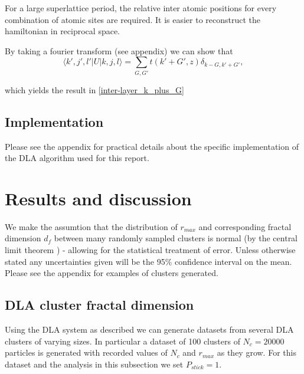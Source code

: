 \documentclass[10pt, twocolumn]{article} %
\begin{document}
  For a large superlattice period, the relative inter atomic positions for every combination of atomic sites are required. It is easier to reconstruct the hamiltonian in reciprocal space.

  By taking a fourier transform (see appendix) we can show that
  \begin{equation}
    \langle k',j',l' | U | k, j, l \rangle = \sum_{G, G'} t(k'+G', z) \delta_{k-G, k'+G'},
    \label{inter-layer_hopping_elements}
  \end{equation}
  
  which yields the result in \ref{inter-layer_k_plus_G}
  


\subsection*{Implementation}
  Please see the appendix for practical details about the specific implementation of the DLA algorithm used for this report.

\section*{Results and discussion}
  We make the assumtion that the distribution of $r_{max}$ and corresponding fractal dimension $d_f$ between many randomly sampled clusters is normal (by the central limit theorem \cite{Sadovnik_2016}) - allowing for the statistical treatment of error. Unless otherwise stated any uncertainties given will be the 95\% confidence interval on the mean. Please see the appendix for examples of clusters generated.

\subsection*{DLA cluster fractal dimension}
  Using the DLA system as described we can generate datasets from several DLA clusters of varying sizes. In particular a dataset of 100 clusters of $N_c = 20000$ particles is generated with recorded values of $N_c$ and $r_{max}$ as they grow. For this dataset and the analysis in this subsection we set $P_{stick} = 1$.
\end{document}
